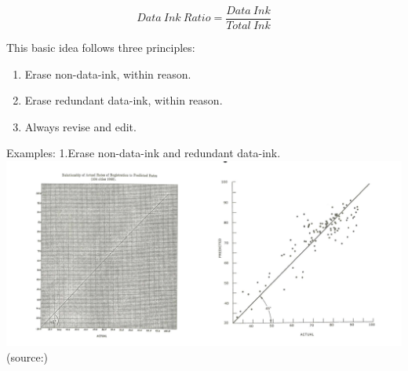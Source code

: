 \documentclass[]{book}
\providecommand{\tightlist}{%
  \setlength{\itemsep}{0pt}\setlength{\parskip}{0pt}}
\theoremstyle{definition}
\theoremstyle{definition}
\theoremstyle{definition}
\theoremstyle{remark}
\begin{document}
\[{Data \ Ink \ Ratio} = \frac{{Data \ Ink}}{{Total \ Ink}}\]

This basic idea follows three principles:

\begin{enumerate}
\def\labelenumi{\arabic{enumi}.}
\tightlist
\item
  Erase non-data-ink, within reason.
\item
  Erase redundant data-ink, within reason.
\item
  Always revise and edit.
\end{enumerate}

Examples: 1.Erase non-data-ink and redundant data-ink.
\includegraphics{images/Tufte_figure1.png} (source:\citep{Tufte_2001})
\end{document}
